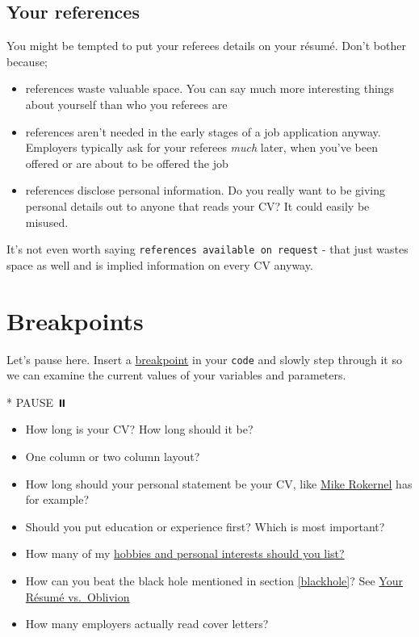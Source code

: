 \documentclass[
]{book}
\newenvironment{Shaded}{\begin{snugshade}}{\end{snugshade}}
\newcommand{\NormalTok}[1]{#1}
\newcommand{\SpecialStringTok}[1]{\textcolor[rgb]{0.31,0.60,0.02}{#1}}
\providecommand{\tightlist}{%
  \setlength{\itemsep}{0pt}\setlength{\parskip}{0pt}}
\begin{document}
\hypertarget{referees}{%
\subsection{Your references}\label{referees}}

You might be tempted to put your referees details on your résumé. Don't bother because;

\begin{itemize}
\tightlist
\item
  references waste valuable space. You can say much more interesting things about yourself than who you referees are
\item
  references aren't needed in the early stages of a job application anyway. Employers typically ask for your referees \emph{much} later, when you've been offered or are about to be offered the job
\item
  references disclose personal information. Do you really want to be giving personal details out to anyone that reads your CV? It could easily be misused.
\end{itemize}

It's not even worth saying \texttt{references\ available\ on\ request} - that just wastes space as well and is implied information on every CV anyway.

\hypertarget{bp7}{%
\section{Breakpoints}\label{bp7}}

Let's pause here. Insert a \href{https://en.wikipedia.org/wiki/Breakpoint}{breakpoint} in your \texttt{code} and slowly step through it so we can examine the current values of your variables and parameters.

\begin{Shaded}
\begin{Highlighting}[]
\SpecialStringTok{* }\NormalTok{PAUSE ⏸️}
\end{Highlighting}
\end{Shaded}

\begin{itemize}
\tightlist
\item
  How long is your CV? How long should it be?
\item
  One column or two column layout?
\item
  How long should your personal statement be your CV, like \href{https://www.cdyf.me/Mike_Rokernel.pdf}{Mike Rokernel} has for example?
\item
  Should you put education or experience first? Which is most important?
\item
  How many of my \href{https://www.reed.co.uk/career-advice/hobbies-and-interests-should-i-include-them-in-my-cv}{hobbies and personal interests should you list?} \citep{hobbies}
\item
  How can you beat the black hole mentioned in section \ref{blackhole}? See \href{https://www.wsj.com/articles/SB10001424052970204624204577178941034941330}{Your Résumé vs.~Oblivion} \citep{oblivion}
\item
  How many employers actually read cover letters?
\end{itemize}
\end{document}
